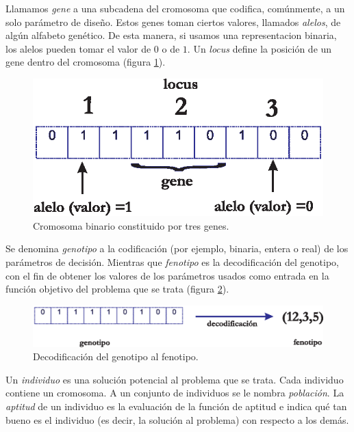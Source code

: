   Llamamos \textit{gene} a una subcadena del cromosoma que codifica, com\'unmente, a un solo par\'ametro de dise\~no. Estos genes toman 
  ciertos valores, llamados \textit{alelos}, de alg\'un alfabeto gen\'etico. De esta manera, si usamos una representacion binaria, 
  los alelos 
  pueden tomar el valor de $0$ o de $1$. Un \textit{locus} define la posici\'on de un gene dentro del cromosoma (figura \ref{fig:gene}).

  \begin{figure}[H]
	\centering
	\includegraphics[scale=0.70]{Cap2/1-17.eps}
	  \caption{Cromosoma binario constituido por tres genes.}
      \label{fig:gene}
      \end{figure}

  Se denomina \textit{genotipo} a la codificaci\'on (por ejemplo, binaria, entera o real) de los par\'ametros de decisi\'on. Mientras 
  que \textit{fenotipo} es la decodificaci\'on del genotipo, con el fin de obtener los valores de los par\'ametros usados como entrada 
  en la funci\'on objetivo del problema que se trata (figura \ref{fig:genotipo}).

  \begin{figure}[H]
	\centering
	\includegraphics[scale=0.70]{Cap2/1-18.eps}
	  \caption{Decodificaci\'on del genotipo al fenotipo.}
      \label{fig:genotipo}
      \end{figure}

  Un \textit{individuo} es una soluci\'on potencial al problema que se trata. Cada individuo contiene un cromosoma. A un conjunto de individuos 
  se le nombra \textit{poblaci\'on}. La \textit{aptitud} de un individuo es la evaluaci\'on de la funci\'on de aptitud e indica qu\'e
  tan bueno es el individuo (es decir, la soluci\'on al problema) con respecto a los dem\'as.

